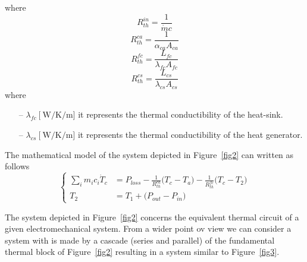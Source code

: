 \documentclass[11pt,a4paper,oneside]{book}
\numberwithin{equation}{section}
\theoremstyle{it}
\theoremstyle{definition}
\begin{document}
where 
\begin{equation}
	R_{th}^{in}=\frac{1}{\dot{m}c}
\end{equation}
\begin{equation}
	R_{th}^{ca}=\frac{1}{\alpha_{ca} A_{ca}}
\end{equation}
\begin{equation}
	R_{th}^{fc}=\frac{L_{fc}}{\lambda_{fc} A_{fc}}
\end{equation}
\begin{equation}
	R_{th}^{cs}=\frac{L_{cs}}{\lambda_{cs} A_{cs}}
\end{equation}
where
\begin{itemize}
	\item[--] $\lambda_{fc}\ \Big[\SI{}{\watt\per\kelvin\per\meter}\Big]$ it represents the thermal conductibility of the heat-sink.	
	\item[--] $\lambda_{cs}\ \Big[\SI{}{\watt\per\kelvin\per\meter}\Big]$ it represents the thermal conductibility of the heat generator.	
\end{itemize}
The mathematical model of the system depicted in Figure~\ref{fig2} can written as follows
\begin{equation}
	\left\lbrace \begin{aligned}
		\sum_{i}m_ic_i\dot{T}_c &= P_{loss}-\frac{1}{R_{th}^{ca}} \big(T_c-T_a\big)-\frac{1}{R_{th}^{fc}}\big(T_c-T_2\big) \\[6pt]
		T_2 &= T_1+\Big(P_{out}-P_{in}\Big)
	\end{aligned}\right. 
\end{equation}


The system depicted in Figure~\ref{fig2} concerns the equivalent thermal circuit of a given electromechanical system. From a wider point ov view we can consider a system with is made by a cascade (series and parallel) of the fundamental thermal block of Figure~\ref{fig2} resulting in a system similar to Figure~\ref{fig3}. 
\end{document}
